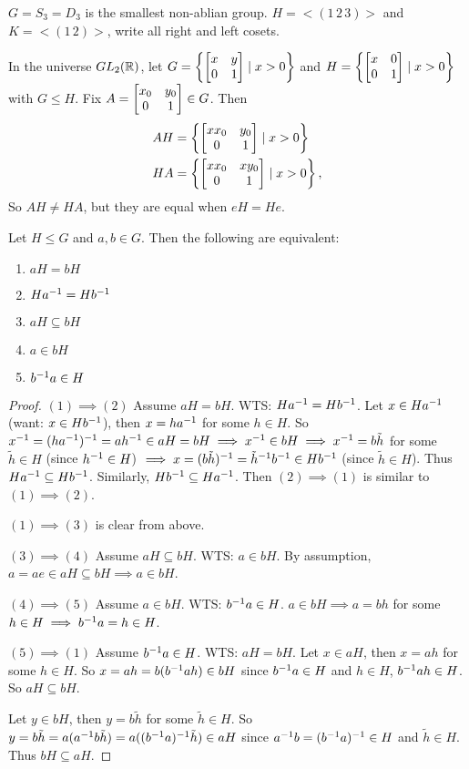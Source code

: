 \documentclass[]{article}
\begin{document}
\begin{example}
	$G = S_3 = D_3$ is the smallest non-ablian group. $H = <(1\,2\,3)>$ and $K = <(1\,2)>$, write all right and left cosets.
\end{example}
\begin{example}
	In the universe $GL_2(\mathbb{R})$, let $G = \left\{\begin{bmatrix}x&y\\0&1\end{bmatrix}\mid x>0\right\}$ and $H = \left\{\begin{bmatrix}x&0\\0&1\end{bmatrix}\mid x>0\right\}$ with $G\leq H$.
	Fix $A = \begin{bmatrix}x_0&y_0\\0&1\end{bmatrix}\in G$.
	Then
	\begin{align*}
		AH &= \left\{ \begin{bmatrix}xx_0&y_0\\0&1\end{bmatrix} \mid x>0\right\} \\
		HA &= \left\{ \begin{bmatrix}xx_0&xy_0\\0&1\end{bmatrix}\mid x>0\right\},
	\end{align*}
	So $AH\neq HA$, but they are equal when $eH = He$.
\end{example}

\begin{lemma}
	 Let $H\leq G$ and $a,b\in G$. Then the following are equivalent:
	\begin{enumerate}
		\item $aH = bH$
		\item $Ha^{-1} = Hb^{-1}$
		\item $aH\subseteq bH$
		\item $a\in bH$
		\item $b^{-1} a\in H$
	\end{enumerate}
\end{lemma}
\begin{proof}
	$(1)\implies(2)$ Assume $aH = bH$. WTS: $Ha^{-1} = Hb^{-1}$.
	Let $x\in Ha^{-1}$ (want: $x\in Hb^{-1}$), then $x = ha^{-1}$ for some $h\in H$.
	So $x^{-1} = (ha^{-1})^{-1} = ah^{-1} \in aH=bH\implies x^{-1} \in bH\implies x^{-1} = b\tilde{h}$ for some $\tilde{h}\in H$ (since $h^{-1}\in H$) $\implies x = (b\tilde{h})^{-1} = \tilde{h}^{-1} b^{-1} \in Hb^{-1}$ (since $\tilde{h}\in H$).
	Thus $Ha^{-1}\subseteq Hb^{-1}$. Similarly, $Hb^{-1} \subseteq Ha^{-1}$.
	Then $(2)\implies(1)$ is similar to $(1)\implies(2)$.

	$(1)\implies(3)$ is clear from above.

	$(3)\implies(4)$ Assume $aH\subseteq bH$. WTS: $a\in bH$. By assumption, $a = ae \in aH\subseteq bH \implies a\in bH$.
	
	$(4)\implies(5)$ Assume $a\in bH$. WTS: $b^{-1} a\in H$.
	$a\in bH\implies a = bh$ for some $h\in H \implies b^{-1} a = h\in H$.

	$(5)\implies(1)$ Assume $b^{-1} a\in H$. WTS: $aH = bH$.
	Let $x\in aH$, then $x = ah$ for some $h\in H$. So $x = ah = b(b^{-1} ah)\in bH$ since $b^{-1} a\in H$ and $h\in H$, $b^{-1} ah\in H$.
	So $aH\subseteq bH$.

	Let $y\in bH$, then $y = b\tilde{h}$ for some $\tilde{h}\in H$. So $y= b\tilde{h} = a(a^{-1} b\tilde{h}) = a((b^{-1} a)^{-1} \tilde{h})\in aH$ since $a^{-1} b = (b^{-1} a)^{-1}\in H$ and $\tilde{h}\in H$. Thus $bH\subseteq aH$.
\end{proof}
\end{document}

